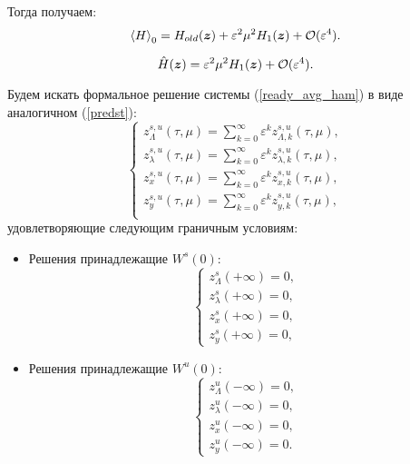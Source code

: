 Тогда получаем:
\begin{equation}
\left\langle H \right\rangle_0 = H_{old}(\boldsymbol{z}) + \varepsilon^2 \mu^2 H_1(\boldsymbol{z}) + \mathcal{O}(\varepsilon^4).
\label{ready_avg_ham}
\end{equation}

\begin{equation*}
\hat H (\boldsymbol{z}) = \varepsilon^2 \mu^2 H_1(\boldsymbol{z}) + \mathcal{O}(\varepsilon^4).
\end{equation*}


Будем искать формальное решение системы (\ref{ready_avg_ham}) в виде аналогичном (\ref{predst}):
\begin{equation}
    \begin{cases}
z_{\Lambda}^{s,u}(\tau, \mu) = \sum_{k=0}^\infty \varepsilon^k z_{\Lambda,k}^{s,u}(\tau, \mu),\\
z_\lambda^{s,u}(\tau, \mu) = \sum_{k=0}^\infty \varepsilon^k z_{\lambda,k}^{s,u}(\tau, \mu),\\
z_x^{s,u}(\tau, \mu) =       \sum_{k=0}^\infty \varepsilon^k z_{x,k}^{s,u}(\tau, \mu),\\
z_y^{s,u}(\tau, \mu) =       \sum_{k=0}^\infty \varepsilon^k z_{y,k}^{s,u}(\tau, \mu),\\
\end{cases}
    \label{predst_h}
\end{equation}
удовлетворяющие следующим граничным условиям:
\begin{itemize}
\item Решения принадлежащие $W^s(0)$:
\begin{equation*}
    \begin{cases}
        z_\Lambda^{s}(+ \infty) = 0, \\
        z_\lambda^{s}(+ \infty) = 0,\\
        z_x^{s}(+ \infty) = 0, \\
        z_y^{s}(+ \infty) = 0,
    \end{cases}
    \label{border_h}
\end{equation*}
\item Решения принадлежащие $W^u(0)$:
\begin{equation*}
    \begin{cases}
        z_\Lambda^{u}(- \infty) = 0, \\
        z_\lambda^{u}(- \infty) = 0,\\
        z_x^{u}(- \infty) = 0, \\
        z_y^{u}(- \infty) = 0.
    \end{cases}
\end{equation*}
\end{itemize}

